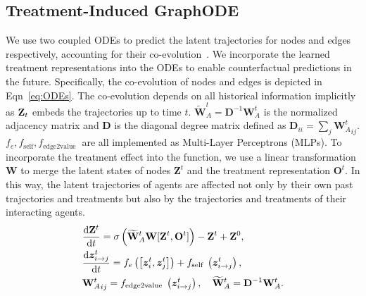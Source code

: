 \subsection{Treatment-Induced GraphODE}
We use two coupled ODEs to predict the latent trajectories for nodes and edges respectively,  accounting for their co-evolution~\cite{huang2021coupled}. We incorporate the learned treatment representations into the ODEs to enable counterfactual predictions in the future.
Specifically, the co-evolution of nodes and edges is depicted in Eqn~\ref{eq:ODEs}. %
{The co-evolution depends on all historical information implicitly as $\mathbf{Z}_t$ embeds the trajectories up to time $t$.} $\tilde{\mathbf{W}}_A^t=\mathbf{D}^{-1} \mathbf{W}_A^t$ is the normalized adjacency matrix and $\mathbf{D}$ is the diagonal degree matrix defined as $\mathbf{D}_{ii} = \sum_j {\mathbf{W}_A^t}_{ij}$. $f_e,f_{\text{self}},f_{\text {edge2value }}$ are all implemented as Multi-Layer Perceptrons (MLPs). To incorporate the treatment effect into the function, we use a linear transformation $\mathbf{W} $ to merge the latent states of nodes $\mathbf{Z}^t$ and the treatment representation $\bm{O}^t$. In this way, the latent trajectories of agents are affected not only by their own past trajectories and treatments but also by the trajectories and treatments of their interacting agents.
\begin{equation}\label{eq:ODEs}
\begin{aligned}
&\frac{\mathrm d \mathbf{Z}^t}{\mathrm d t}=\sigma\left(\widetilde{\mathbf{W}}_A^t \mathbf{W}[\mathbf{Z}^t,\mathbf{O}^t]\right)-\mathbf{Z}^t+\mathbf{Z}^0,\\
& \frac{\mathrm d \bm{z}_{i \rightarrow j}^t}{\mathrm d t}=f_e\left(\left[\bm{z}_i^t, \bm{z}_j^t\right]\right)+f_{\text {self }}\left(\bm{z}_{i \rightarrow j}^t\right), \\ 
&{\mathbf{W}_A^t}_{ij}=f_{\text {edge2value }}\left(\bm{z}_{i \rightarrow j}^t\right), \quad \widetilde{\mathbf{W}}_A^t=\mathbf{D}^{-1} \mathbf{W}_A^t.\end{aligned}
\end{equation}



